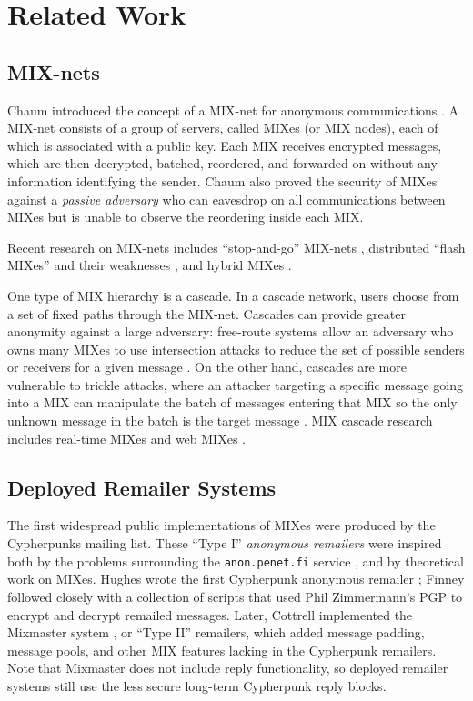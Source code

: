 \documentclass{llncs}
\begin{document}

\section{Related Work}

\subsection{MIX-nets}

Chaum introduced the concept of a MIX-net for anonymous communications
\cite{chaum-mix}. A MIX-net consists of a group of servers, called
MIXes (or MIX nodes), each of which is associated with a public
key. Each MIX receives encrypted messages, which are then decrypted,
batched, reordered, and forwarded on without any information
identifying the sender. Chaum also proved the security of MIXes
against a \emph{passive adversary} who can eavesdrop on all
communications between MIXes but is unable to observe the reordering
inside each MIX.

Recent research on MIX-nets includes ``stop-and-go'' MIX-nets
\cite{kesdogan}, distributed ``flash MIXes'' \cite{flash-mix} and their
weaknesses \cite{desmedt,mitkuro}, and hybrid MIXes \cite{hybrid-mix}.

One type of MIX hierarchy is a cascade.
In a cascade network, users choose from a set of fixed paths through
the MIX-net.
Cascades can provide greater anonymity against a large adversary:
free-route systems allow an adversary who owns many MIXes to use
intersection attacks to reduce the set of possible senders or receivers
for a given
message \cite{disad-free-routes}. On the other hand, cascades are more
vulnerable \cite{batching-taxonomy} to trickle attacks, where an attacker
targeting a specific message going into a MIX can manipulate the batch
of messages entering that MIX so the only unknown message in the batch
is the target message \cite{mixmaster-attacks,babel}.
MIX cascade research includes real-time MIXes \cite{realtime-mix} and
web MIXes \cite{web-mix}.

\subsection{Deployed Remailer Systems}

The first widespread public implementations of MIXes were produced by the
Cypherpunks mailing list. These ``Type I'' \emph{anonymous remailers}
were inspired both by the problems surrounding the {\tt anon.penet.fi}
service \cite{helsingius}, and by theoretical work on MIXes. Hughes wrote
the first Cypherpunk anonymous remailer \cite{remailer-history}; Finney
followed closely with a collection of scripts that used Phil Zimmermann's
PGP to encrypt and decrypt remailed messages. Later, Cottrell implemented
the Mixmaster system \cite{mixmaster,mixmaster-spec}, or ``Type II'' remailers,
which added message padding, message pools, and other MIX features lacking
in the Cypherpunk remailers. Note that Mixmaster does not include reply
functionality, so deployed remailer systems still use the less secure
long-term Cypherpunk reply blocks.
\end{document}
